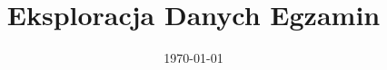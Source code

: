 


\title{Eksploracja Danych Egzamin}
\author{}
\date{\today}

%


\maketitle
{
\setcounter{tocdepth}{3}
\tableofcontents
\newpage
{} 
}












% 
% 

